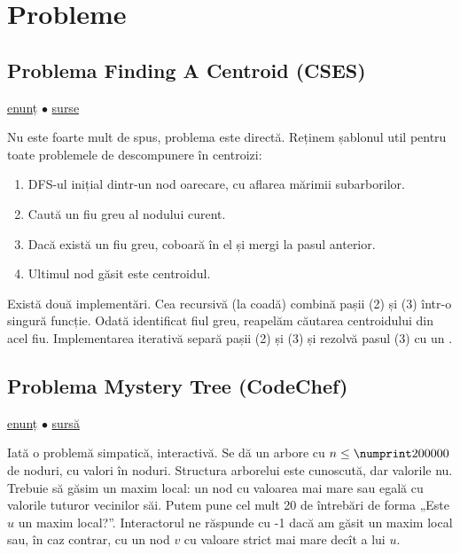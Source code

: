 \documentclass[../main.tex]{subfiles}
\begin{document}
\section{Probleme}

\subsection{Problema Finding A Centroid (CSES)}
\label{problem:finding-a-centroid}

\href{https://cses.fi/problemset/task/2079}{enunț}
$\bullet$
\hyperref[code:finding-a-centroid]{surse}

Nu este foarte mult de spus, problema este directă. Reținem șablonul util pentru toate problemele de descompunere în centroizi:

\begin{enumerate}
  \item DFS-ul inițial dintr-un nod oarecare, cu aflarea mărimii subarborilor.
  \item Caută un fiu greu al nodului curent.
  \item Dacă există un fiu greu, coboară în el și mergi la pasul anterior.
  \item Ultimul nod găsit este centroidul.
\end{enumerate}

Există două implementări. Cea recursivă (la coadă) combină pașii (2) și (3) într-o singură funcție. Odată identificat fiul greu, reapelăm căutarea centroidului din acel fiu. Implementarea iterativă separă pașii (2) și (3) și rezolvă pasul (3) cu un .

\subsection{Problema Mystery Tree (CodeChef)}
\label{problem:mystery-tree}

\href{https://www.codechef.com/problems/MYS00T}{enunț}
$\bullet$
\hyperref[code:mystery-tree]{sursă}

Iată o problemă simpatică, interactivă. Se dă un arbore cu $n \leq \np{200000}$ de noduri, cu valori în noduri. Structura arborelui este cunoscută, dar valorile nu. Trebuie să găsim un maxim local: un nod cu valoarea mai mare sau egală cu valorile tuturor vecinilor săi. Putem pune cel mult 20 de întrebări de forma „Este $u$ un maxim local?”. Interactorul ne răspunde cu -1 dacă am găsit un maxim local sau, în caz contrar, cu un nod $v$ cu valoare strict mai mare decît a lui $u$.
\end{document}
